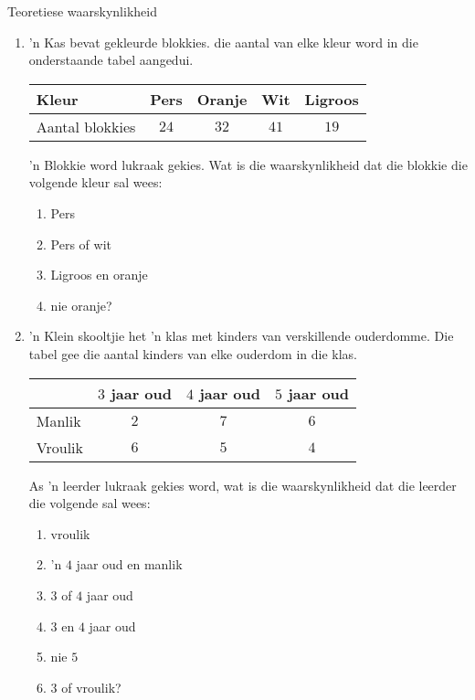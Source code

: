 \begin{exercises}{Teoretiese waarskynlikheid}
  \begin{enumerate}[itemsep=5pt, label=\textbf{\arabic*}]
  \item  'n Kas bevat gekleurde blokkies. die aantal van elke kleur word in die onderstaande tabel aangedui.

    \begin{center}
      \begin{tabular}{lcccc}
        \toprule
        Kleur & Pers & Oranje & Wit & Ligroos \\
        \midrule
        Aantal blokkies & $24$ & $32$ & $41$ & $19$ \\
        \bottomrule
      \end{tabular}
    \end{center}

    'n Blokkie word lukraak gekies. Wat is die waarskynlikheid dat die blokkie die volgende kleur sal wees:
    \begin{enumerate}
    \item Pers
    \item Pers of wit
    \item Ligroos en oranje
    \item nie oranje?
    \end{enumerate}

  \item 'n Klein skooltjie het 'n klas met kinders van verskillende ouderdomme. Die tabel gee die aantal kinders van elke ouderdom in die klas.

    \begin{center}
      \begin{tabular}{lccc}
        \toprule
               & $3$ jaar oud & $4$ jaar oud& $5$ jaar oud \\
       \midrule
        Manlik   & $2$ & $7$ & $6$ \\
        Vroulik & $6$ & $5$ & $4$ \\
        \bottomrule
      \end{tabular}
    \end{center}

    As 'n leerder lukraak gekies word, wat is die waarskynlikheid dat die leerder die volgende sal wees:
    \begin{enumerate}
    \item vroulik
    \item 'n $4$ jaar oud en manlik 
    \item $3$ of $4$ jaar oud
    \item $3$ en $4$ jaar oud
    \item nie $5$
    \item $3$ of vroulik?
    \end{enumerate}


\end{enumerate}
\end{exercises}
